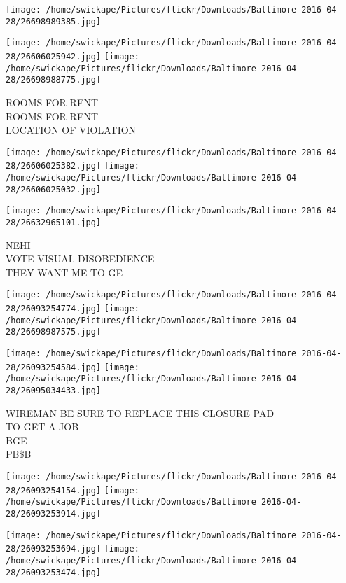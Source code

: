 \documentclass[10pt,letterpaper]{article}
\begin{document}
\texttt{[image: /home/swickape/Pictures/flickr/Downloads/Baltimore 2016-04-28/26698989385.jpg]}

\vspace{0.25in}
\texttt{[image: /home/swickape/Pictures/flickr/Downloads/Baltimore 2016-04-28/26606025942.jpg]}
\texttt{[image: /home/swickape/Pictures/flickr/Downloads/Baltimore 2016-04-28/26698988775.jpg]}

ROOMS FOR RENT\\
ROOMS FOR RENT\\
LOCATION OF VIOLATION
\pagebreak

\texttt{[image: /home/swickape/Pictures/flickr/Downloads/Baltimore 2016-04-28/26606025382.jpg]}
\texttt{[image: /home/swickape/Pictures/flickr/Downloads/Baltimore 2016-04-28/26606025032.jpg]}

\vspace{0.25in}
\texttt{[image: /home/swickape/Pictures/flickr/Downloads/Baltimore 2016-04-28/26632965101.jpg]}

NEHI\\
VOTE VISUAL DISOBEDIENCE\\
THEY WANT ME TO GE
\pagebreak

\texttt{[image: /home/swickape/Pictures/flickr/Downloads/Baltimore 2016-04-28/26093254774.jpg]}
\texttt{[image: /home/swickape/Pictures/flickr/Downloads/Baltimore 2016-04-28/26698987575.jpg]}

\texttt{[image: /home/swickape/Pictures/flickr/Downloads/Baltimore 2016-04-28/26093254584.jpg]}
\texttt{[image: /home/swickape/Pictures/flickr/Downloads/Baltimore 2016-04-28/26095034433.jpg]}

WIREMAN BE SURE TO REPLACE THIS CLOSURE PAD\\
TO GET A JOB\\
BGE\\
PB\$B
\pagebreak

\texttt{[image: /home/swickape/Pictures/flickr/Downloads/Baltimore 2016-04-28/26093254154.jpg]}
\texttt{[image: /home/swickape/Pictures/flickr/Downloads/Baltimore 2016-04-28/26093253914.jpg]}

\texttt{[image: /home/swickape/Pictures/flickr/Downloads/Baltimore 2016-04-28/26093253694.jpg]}
\texttt{[image: /home/swickape/Pictures/flickr/Downloads/Baltimore 2016-04-28/26093253474.jpg]}
\end{document}
